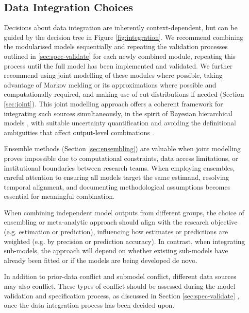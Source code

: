 \documentclass{article}
\begin{document}
\subsection{Data Integration Choices}\label{sec:integration}

Decisions about data integration are inherently context-dependent, but can be guided by the decision tree in Figure \ref{fig:integration}. We recommend combining the modularised models sequentially and repeating the validation processes outlined in \ref{sec:spec-validate} for each newly combined module, repeating this process until the full model has been implemented and validated.
We further recommend using joint modelling of these modules where possible, taking advantage of Markov melding \citep{goudie2019joining} or its approximations where possible and computationally required,  and making use of cut distributions \citep{plummer2015cuts} if needed (Section \ref{sec:joint}). 
This joint modelling approach offers a coherent framework for integrating such sources simultaneously, in the spirit of Bayesian hierarchical models \citep{gelman2020bayesian}, with suitable uncertainty quantification and avoiding the definitional ambiguities that affect output-level combinations \citep{manley2024combining, brockhaus2023why}. 

Ensemble methods (Section \ref{sec:ensembling}) are valuable when joint modelling proves impossible due to computational constraints, data access limitations, or institutional boundaries between research teams.
When employing ensembles, careful attention to ensuring all models target the same estimand, resolving temporal alignment, and documenting methodological assumptions becomes essential for meaningful combination. 

When combining independent model outputs from different groups, the choice of ensembling or meta-analytic approach should align with the research objective (e.g. estimation or prediction), influencing how estimates or predictions are weighted (e.g. by precision or prediction accuracy). In contrast, when integrating sub-models, the approach will depend on whether existing sub-models have already been fitted or if the models are being developed de novo.

In addition to prior-data conflict and submodel conflict, different data sources may also conflict. These types of conflict should be assessed during the model validation and specification process, as discussed in Section \ref{sec:spec-validate} \citep{presanis2013conflict,sherratt2021exploring,yang2025detecting}, once the data integration process has been decided upon.
\end{document}
